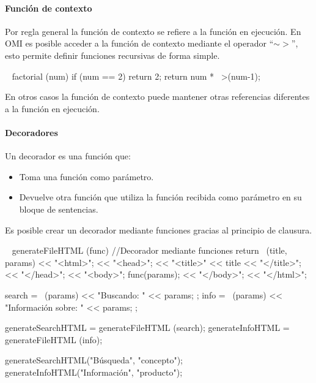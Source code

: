 \paragraph{Función de contexto}
Por regla general la función de contexto se refiere a la función en ejecución. En OMI es 
posible acceder a la función de contexto mediante el operador ``$\sim>$'', esto permite definir 
funciones recursivas de forma simple. \\

\begin{myverbatim}
   ~ factorial (num) {
      if (num == 2) return 2;
      return num * ~>(num-1);
   }
\end{myverbatim}

En otros casos la función de contexto puede mantener otras referencias diferentes a la función 
en ejecución.

\paragraph{Decoradores}


Un decorador es una función que:
\begin{itemize}
\item Toma una función como parámetro. 
\item Devuelve otra función que utiliza la función recibida como parámetro en su bloque de sentencias.
\end{itemize}

Es posible crear un decorador mediante funciones gracias al principio de clausura. \\

\begin{myverbatim}
   ~ generateFileHTML (func) { //Decorador mediante funciones
      return ~(title, params){
         << "<html>";
         << "<head>";
         << "<title>" << title << "</title>";
         << "</head>";
         << "<body>";
         func(params);
         << "</body>";
         << "</html>";
      }
   }
   
   search = ~(params) { << "Buscando: " << params; };
   info = ~(params) { << "Información sobre: " << params; };
   
   generateSearchHTML = generateFileHTML (search);
   generateInfoHTML = generateFileHTML (info);
   
   generateSearchHTML("Búsqueda", "concepto");
   generateInfoHTML("Información", "producto");
\end{myverbatim}

